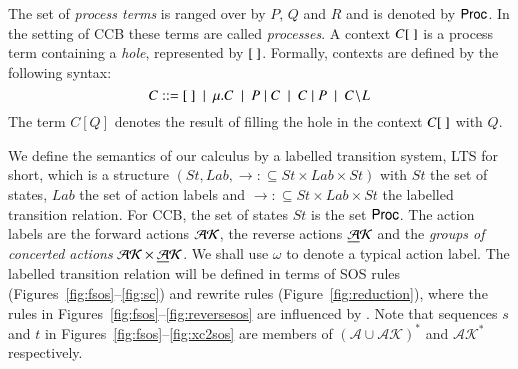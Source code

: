 {%
%

The set of \emph{process terms} is ranged over by $P$, $Q$ and $R$ and is denoted by $\mathsf{Proc}$. 
In the setting of CCB these terms are called \emph{processes}. 
A context $C[\ ]$ is a process term containing a \emph{hole}, represented by $[\ ]$. 
Formally, contexts are defined by the following syntax: 
$$C::= \hole\ \mid\ \mu.C\ \mid\  P\paral C \ \mid\  C \paral P \ \mid \ C\restrict L $$
The term $C[Q]$ denotes the result of filling the hole in the context $C[\ ]$ with $Q$.

We define the semantics of our calculus by a labelled transition system,
LTS for short, which is a structure $(St,\mathit{Lab},\rightarrow: \subseteq St \times \mathit{Lab} \times St)$
with $St$ the set of states, $\mathit{Lab}$ the set of action labels and $\rightarrow: 
\subseteq St \times \mathit{Lab} \times St$ the labelled transition relation.
For CCB, the set of states $St$ is the set $\mathsf{Proc}$. 
The action labels are the forward actions $\mathcal{AK}$, 
the reverse actions $\underline{\mathcal{A}}\mathcal{K}$ and the \emph{groups of concerted actions} $\mathcal{AK} \times \underline{\mathcal{A}}\mathcal{K} $. We shall
use $\omega$ to denote a typical action label.
%
%
The labelled transition relation will be defined in terms of SOS rules (Figures~\ref{fig:fsos}--\ref{fig:sc}) 
and rewrite rules (Figure~\ref{fig:reduction}), where
the rules in Figures~\ref{fig:fsos}--\ref{fig:reversesos}
are influenced by \cite{PHILLIPS200770}.  
Note that sequences $s$ and $t$ in Figures~\ref{fig:fsos}--\ref{fig:xc2sos} 
are members of $(\mathcal{A}\cup\mathcal{AK})^*$ and $\mathcal{AK}^*$ respectively.

}
